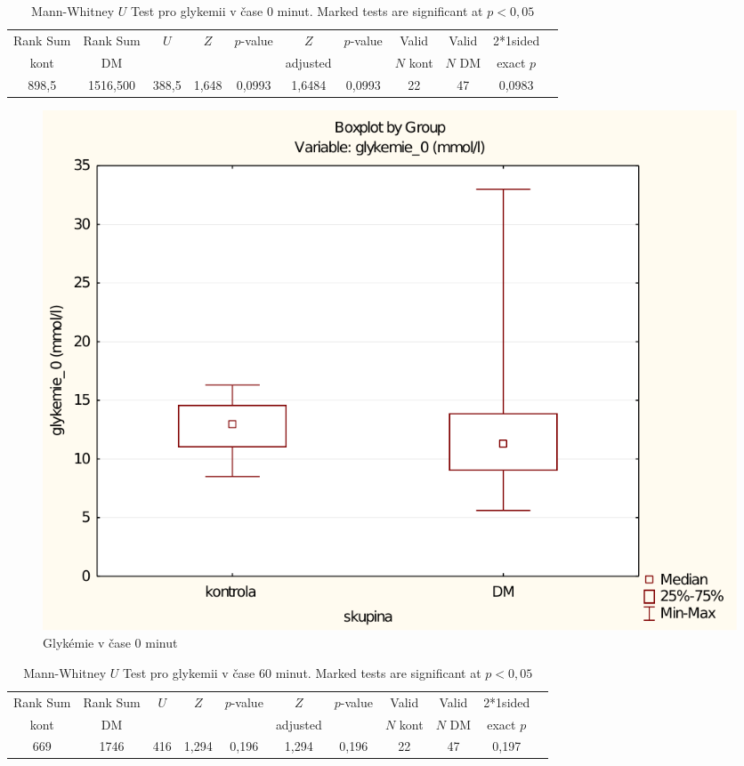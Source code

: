 \documentclass[12pt]{article}
\begin{document}
\begin{table}[bh]
\begin{tabular}{|c|c|c|c|c|c|c|c|c|c|c|}
\hline
Rank Sum & Rank Sum & $U$ & $Z$ & $p$-value & $Z$ & $p$-value & Valid & Valid & 2*1sided \\
kont & DM & & & & adjusted & & $N$ kont & $N$ DM & exact $p$ \\
\hline
898,5 & 1516,500 & 388,5 & 1,648 & 0,0993 & 1,6484 & 0,0993 & 22 & 47 & 0,0983 \\
\hline
\end{tabular}
\caption{Mann-Whitney $U$ Test pro glykemii v čase 0 minut. Marked tests are significant at $p < 0,05$}
\end{table}

\begin{figure}[bh]
	\begin{centering}
	\includegraphics[width=0.75\linewidth]{glykemie0-box.pdf}
	\caption{Glykémie v čase 0 minut}
	\end{centering}
\end{figure}

\begin{table}
\begin{tabular}{|c|c|c|c|c|c|c|c|c|c|c|}
\hline
Rank Sum & Rank Sum & $U$ & $Z$ & $p$-value & $Z$ & $p$-value & Valid & Valid & 2*1sided \\
kont & DM & & & & adjusted & & $N$ kont & $N$ DM & exact $p$ \\
\hline
669 & 1746 & 416 & 1,294 & 0,196 & 1,294 & 0,196 & 22 & 47 & 0,197 \\
\hline
\end{tabular}
\caption{Mann-Whitney $U$ Test pro glykemii v čase 60 minut. Marked tests are significant at $p < 0,05$}
\end{table}
\end{document}
